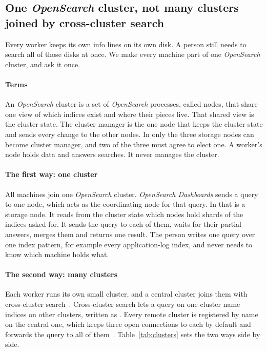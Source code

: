 \subsection{One \textit{OpenSearch} cluster, not many clusters joined by cross-cluster search}\label{sec:why-cluster}

Every worker keeps its own info lines on its own disk. A person still needs to search all of those disks at once. We make every machine part of one \textit{OpenSearch} cluster, and ask it once.

\paragraph{Terms}
An \textit{OpenSearch} cluster is a set of \textit{OpenSearch} processes, called nodes, that share one view of which indices exist and where their pieces live. That shared view is the cluster state. The cluster manager is the one node that keeps the cluster state and sends every change to the other nodes. In \loggy{} only the three storage nodes can become cluster manager, and two of the three must agree to elect one. A worker's node holds data and answers searches. It never manages the cluster.

\paragraph{The first way: one cluster}
All machines join one \textit{OpenSearch} cluster. \textit{OpenSearch Dashboards} sends a query to one node, which acts as the coordinating node for that query. In \loggy{} that is a storage node. It reads from the cluster state which nodes hold shards of the indices asked for. It sends the query to each of them, waits for their partial answers, merges them and returns one result. The person writes one query over one index pattern, for example every application-log index, and never needs to know which machine holds what.

\paragraph{The second way: many clusters}
Each worker runs its own small cluster, and a central cluster joins them with cross-cluster search~\cite{ref:ccs}. Cross-cluster search lets a query on one cluster name indices on other clusters, written as . Every remote cluster is registered by name on the central one, which keeps three open connections to each by default and forwards the query to all of them~\cite{ref:ccsforum}. Table~\ref{tab:clusters} sets the two ways side by side.

